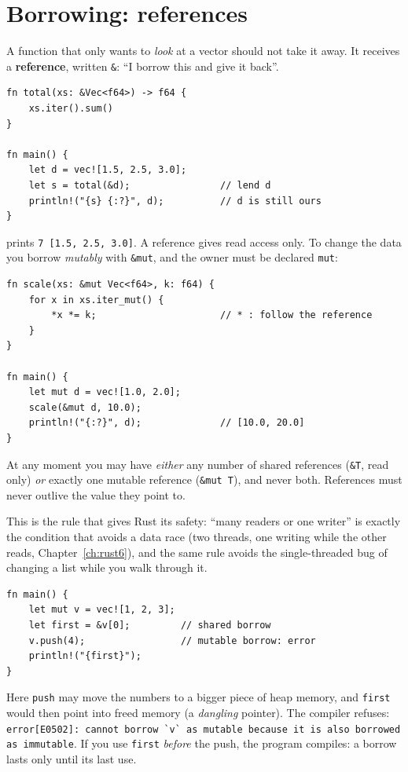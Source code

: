 \section*{Borrowing: references}
A function that only wants to \emph{look} at a vector should not take it away. It receives a \textbf{reference}, written \verb!&!: ``I borrow this and give it back''.
\begin{verbatim}
fn total(xs: &Vec<f64>) -> f64 {
    xs.iter().sum()
}

fn main() {
    let d = vec![1.5, 2.5, 3.0];
    let s = total(&d);                // lend d
    println!("{s} {:?}", d);          // d is still ours
}
\end{verbatim}
prints \verb!7 [1.5, 2.5, 3.0]!. A reference gives read access only. To change the data you borrow \emph{mutably} with \verb!&mut!, and the owner must be declared \verb!mut!:
\begin{verbatim}
fn scale(xs: &mut Vec<f64>, k: f64) {
    for x in xs.iter_mut() {
        *x *= k;                      // * : follow the reference
    }
}

fn main() {
    let mut d = vec![1.0, 2.0];
    scale(&mut d, 10.0);
    println!("{:?}", d);              // [10.0, 20.0]
}
\end{verbatim}
\begin{keyidea}
At any moment you may have \emph{either} any number of shared references (\verb!&T!, read only) \emph{or} exactly one mutable reference (\verb!&mut T!), and never both. References must never outlive the value they point to.
\end{keyidea}
This is the rule that gives Rust its safety: ``many readers or one writer'' is exactly the condition that avoids a data race (two threads, one writing while the other reads, Chapter~\ref{ch:rust6}), and the same rule avoids the single-threaded bug of changing a list while you walk through it.
\begin{verbatim}
fn main() {
    let mut v = vec![1, 2, 3];
    let first = &v[0];         // shared borrow
    v.push(4);                 // mutable borrow: error
    println!("{first}");
}
\end{verbatim}
Here \verb!push! may move the numbers to a bigger piece of heap memory, and \verb!first! would then point into freed memory (a \emph{dangling} pointer). The compiler refuses: \verb!error[E0502]: cannot borrow `v` as mutable because it is also borrowed as immutable!. If you use \verb!first! \emph{before} the push, the program compiles: a borrow lasts only until its last use.
